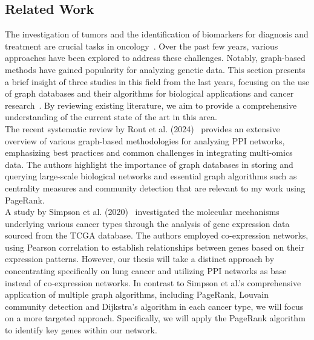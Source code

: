 \subsection{Related Work} \label{subsec:related_work}
The investigation of tumors and the identification of biomarkers for diagnosis and treatment are crucial tasks in oncology~\cite{das2024biomarkers}.
Over the past few years, various approaches have been explored to address these challenges.
Notably, graph-based methods have gained popularity for analyzing genetic data.
This section presents a brief insight of three studies in this field from the last years,
focusing on the use of graph databases and their algorithms for biological applications and
cancer research~\cite{rout2024systematic, simpson2020applying, shan2020network}.
By reviewing existing literature, we aim to provide a comprehensive understanding of the current state of the art in this area.
\\

The recent systematic review by Rout et al. (2024)~\cite{rout2024systematic} provides an extensive overview of
various graph-based methodologies for analyzing PPI networks,
emphasizing best practices and common challenges in integrating multi-omics data.
The authors highlight the importance of graph databases in storing and querying large-scale biological networks
and essential graph algorithms such as centrality measures and community detection that are relevant to my work using PageRank.
\\

A study by Simpson et al. (2020)~\cite{simpson2020applying} investigated the molecular mechanisms underlying various cancer types
through the analysis of gene expression data sourced from the TCGA database.
The authors employed co-expression networks, using Pearson correlation to establish relationships between genes based on their expression patterns.
However, our thesis will take a distinct approach by concentrating specifically on lung cancer
and utilizing PPI networks as base instead of co-expression networks.
In contrast to Simpson et al.'s comprehensive application of multiple graph algorithms, including PageRank,
Louvain community detection and Dijkstra's algorithm in each cancer type, we will focus on a more targeted approach.
Specifically, we will apply the PageRank algorithm to identify key genes within our network.
\\

